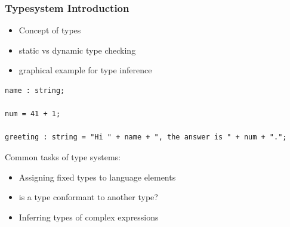 \begin{frame}
  \frametitle{Typesystem Introduction}
  \begin{itemize}
    \item Concept of types
    \item static vs dynamic type checking
  \end{itemize}

  \begin{itemize}
    \item graphical example for type inference
   \end{itemize}

\begin{verbatim}
name : string;

num = 41 + 1;

greeting : string = "Hi " + name + ", the answer is " + num + ".";
\end{verbatim}

Common tasks of type systems:

\begin{itemize}
  \item Assigning fixed types to language elements
  \item is a type conformant to another type?
  \item Inferring types of complex expressions
\end{itemize}

\end{frame}

